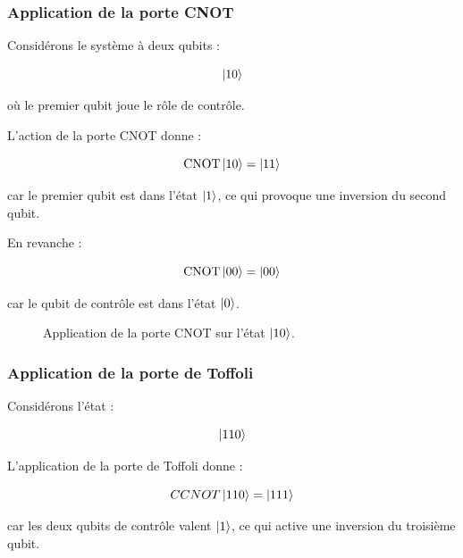 \documentclass[a4paper,12pt]{article}
\begin{document}
\subsubsection{Application de la porte CNOT}

Considérons le système à deux qubits :

\[
\ket{10}
\]

où le premier qubit joue le rôle de contrôle.

L’action de la porte CNOT donne :

\[
\text{CNOT}\ket{10}
=
\ket{11}
\]

car le premier qubit est dans l’état $\ket{1}$, ce qui provoque une inversion du second qubit.

En revanche :

\[
\text{CNOT}\ket{00}
=
\ket{00}
\]

car le qubit de contrôle est dans l’état $\ket{0}$.

\begin{figure}[H]
\centering
{}
\caption{Application de la porte CNOT sur l’état $\ket{10}$.}
\end{figure}

\subsubsection{Application de la porte de Toffoli}

Considérons l’état :

\[
\ket{110}
\]

L’application de la porte de Toffoli donne :

\[
CCNOT\ket{110}
=
\ket{111}
\]

car les deux qubits de contrôle valent $\ket{1}$, ce qui active une inversion du troisième qubit.
\end{document}
